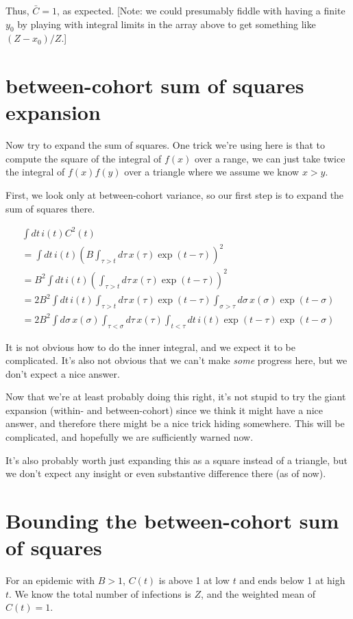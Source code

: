 \documentclass[12pt]{article}
\begin{document}
Thus, $\bar C = 1$, as expected. [Note: we could presumably fiddle with having a finite $y_0$ by playing with integral limits in the array above to get something like $(Z-x_0)/Z$.]

\section{between-cohort sum of squares expansion}
Now try to expand the sum of squares. One trick we're using here is that to compute the square of the integral of $f(x)$ over a range, we can just take twice the integral of $f(x)f(y)$ over a triangle where we assume we know $x>y$.

First, we look only at between-cohort variance, so our first step is to expand the sum of squares there.

\begin{eqnarray}
\int{dt\, i(t) C^2(t)}
	\\ = \int{dt\, i(t) \left(
		B \int_{\tau>t}{d\tau\, x(\tau) \exp(t-\tau)}
	\right)^2}
	\\ = B^2 \int{dt\, i(t) \left(
		\int_{\tau>t}{d\tau\, x(\tau) \exp(t-\tau)}
	\right)^2}
	\\ =  2B^2 \int{dt\, i(t)
		\int_{\tau>t}{d\tau\,  x(\tau) \exp(t-\tau)
			\int_{\sigma>\tau}{d\sigma\, x(\sigma)\exp(t-\sigma)}
		}
	}
	\\ =  2B^2 \int{
		d\sigma\, x(\sigma) \int_{\tau<\sigma}{
			d\tau\,  x(\tau) \int_{t<\tau}{
				dt\, i(t) \exp(t-\tau) \exp(t-\sigma)
			}
		}
	}
\end{eqnarray}

It is not obvious how to do the inner integral, and we expect it to be complicated. It's also not obvious that we can't make \emph{some} progress here, but we don't expect a nice answer.

Now that we're at least probably doing this right, it's not stupid to try the giant expansion (within- and between-cohort) since we think it might have a nice answer, and therefore there might be a nice trick hiding somewhere. This will be complicated, and hopefully we are sufficiently warned now.

It's also probably worth just expanding this as a square instead of a triangle, but we don't expect any insight or even substantive difference there (as of now).

\section{Bounding the between-cohort sum of squares}
For an epidemic with $B>1$, $C(t)$ is above 1 at low $t$ and ends below 1 at high $t$. We know the total number of infections is $Z$, and the weighted mean of $C(t) =1$.
\end{document}

